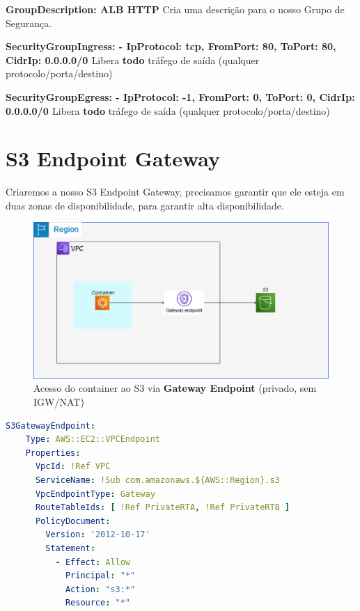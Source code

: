 \textbf{GroupDescription: ALB HTTP} Cria uma descrição para o nosso Grupo de Segurança.

\textbf{SecurityGroupIngress: - { IpProtocol: tcp, FromPort: 80, ToPort: 80, CidrIp: 0.0.0.0/0 }} Libera \textbf{todo} tráfego de saída (qualquer protocolo/porta/destino)
        
\textbf{SecurityGroupEgress: - { IpProtocol: -1, FromPort: 0, ToPort: 0, CidrIp: 0.0.0.0/0 }} Libera \textbf{todo} tráfego de saída (qualquer protocolo/porta/destino)

\section{S3 Endpoint Gateway}
Criaremos a nosso S3 Endpoint Gateway, precisamos garantir que ele esteja em duas zonas de disponibilidade, para garantir alta disponibilidade.

\begin{figure}[H]
\centering
\caption{Acesso do container ao S3 via \textbf{Gateway Endpoint} (privado, sem IGW/NAT)}
\label{fig:rt-privada}
\includegraphics[scale=0.25]{imagens/VPC-Endpoint.png}
\end{figure}

\begin{lstlisting}[language=YAML]
S3GatewayEndpoint:
    Type: AWS::EC2::VPCEndpoint
    Properties:
      VpcId: !Ref VPC
      ServiceName: !Sub com.amazonaws.${AWS::Region}.s3
      VpcEndpointType: Gateway
      RouteTableIds: [ !Ref PrivateRTA, !Ref PrivateRTB ]
      PolicyDocument:
        Version: '2012-10-17'
        Statement:
          - Effect: Allow
            Principal: "*"
            Action: "s3:*"
            Resource: "*"
\end{lstlisting}


